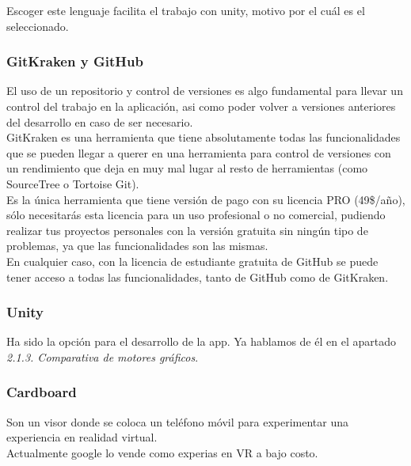 \quad Escoger este lenguaje facilita el trabajo con unity, motivo por el cuál es el seleccionado.\\
	
	\subsubsection{GitKraken y GitHub}
	
\quad El uso de un repositorio y control de versiones es algo fundamental para llevar un control del trabajo en la aplicación, asi como poder volver a versiones anteriores del desarrollo en caso de ser necesario.\\

\quad GitKraken es una herramienta que tiene absolutamente todas las funcionalidades que se pueden llegar a querer en una herramienta para control de versiones con un rendimiento que deja en muy mal lugar al resto de herramientas (como SourceTree o Tortoise Git).\\

\quad Es la única herramienta que tiene versión de pago con su licencia PRO (49\$/año), sólo necesitarás esta licencia para un uso profesional o no comercial, pudiendo realizar tus proyectos personales con la versión gratuita sin ningún tipo de problemas, ya que las funcionalidades son las mismas.\\

\quad En cualquier caso, con la licencia de estudiante gratuita de GitHub se puede tener acceso a todas las funcionalidades, tanto de GitHub como de GitKraken.\\


	\subsubsection{Unity}

\quad Ha sido la opción para el desarrollo de la app. Ya hablamos de él en el apartado \textit{2.1.3. Comparativa de motores gráficos}.
	
	\subsubsection{Cardboard}

\quad Son un visor donde se coloca un teléfono móvil para experimentar una experiencia en realidad virtual.\\

\quad Actualmente google lo vende como experias en VR a bajo costo.\\

\newpage



